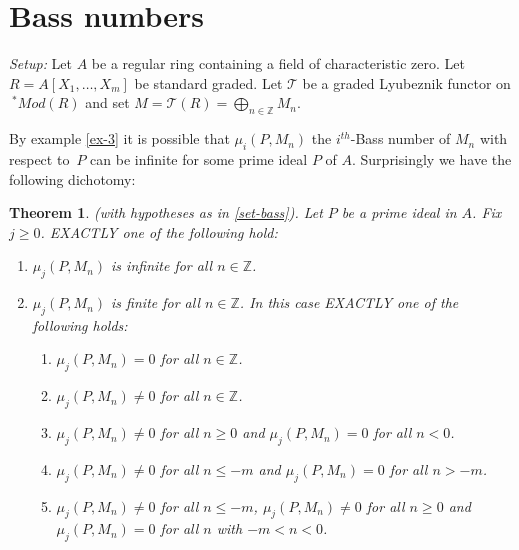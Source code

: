 \documentclass{amsart}
\newcommand{\wrt}{with respect to}
\newcommand{\ZZ}{\mathbb{Z} }
\newcommand{\FF}{\mathcal{T}}
\theoremstyle{plain}
\newtheorem{theorem}{Theorem}[section]
\theoremstyle{definition}
\theoremstyle{remark}
\begin{document}
\section{Bass numbers}
 \s \label{set-bass} \textit{Setup:} Let $A$ be a regular ring containing a field of characteristic zero. Let $R = A[X_1,\ldots, X_m]$ be standard graded. Let $\FF$ be a graded Lyubeznik functor on $\ ^* Mod(R)$ and set $M = \FF(R) = \bigoplus_{n \in \ZZ}M_n$. 

By example \ref{ex-3} it is possible that $\mu_i(P, M_n)$  the $i^{th}$-Bass number of $M_n$ \wrt \ $P$ can be infinite for some prime ideal $P$ of $A$. 
Surprisingly  we have the following dichotomy:
\begin{theorem}
\label{bass-basic-proof}(with hypotheses as in \ref{set-bass}).  Let $P$ be a prime ideal in $A$. Fix $j \geq 0$. EXACTLY one of the following hold:
\begin{enumerate}[\rm(i)]
\item
$\mu_j(P, M_n)$ is infinite for all $n \in \ZZ$.
\item
$\mu_j(P, M_n)$ is finite for all $n \in \ZZ$. In this case EXACTLY one of the following holds:
\begin{enumerate}[\rm (a)]
\item
$\mu_j(P, M_n) = 0$ for all $n \in \ZZ$.
\item
$\mu_j(P, M_n) \neq 0$ for all $n \in \ZZ$.
\item
$\mu_j(P, M_n) \neq 0$ for all $n  \geq 0$ and $\mu_j(P, M_n) = 0$ for all 
$n < 0$.
\item
$\mu_j(P, M_n) \neq 0$ for all $n  \leq -m$ and $\mu_j(P, M_n) = 0$ for all 
$n > -m$.
\item
$\mu_j(P, M_n) \neq 0$ for all $n  \leq -m$, $\mu_j(P, M_n) \neq 0$ for all $n  \geq 0$ and $\mu_j(P, M_n) = 0$ for all $n$ with $-m < n< 0$.
\end{enumerate}
\end{enumerate}
\end{theorem}
\end{document}

